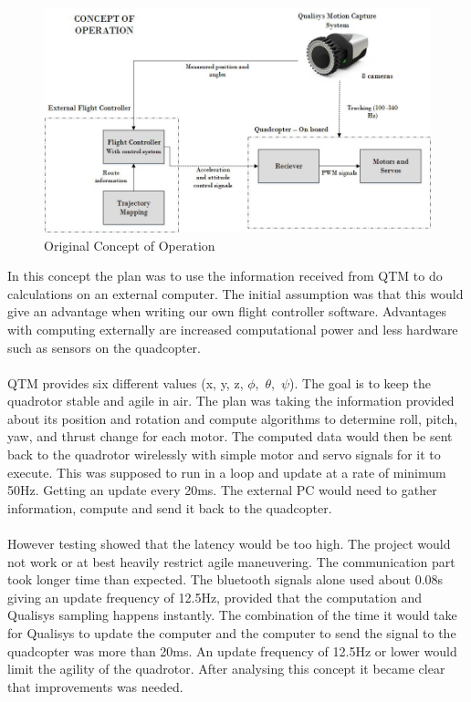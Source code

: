 \begin{figure}[H]
          \centering
            \includegraphics[scale = 0.6]{VAPIQ-PICTURES/ConceptOfOperation.jpg}
                \caption{Original Concept of Operation}
                \label{OCO}
            \label{dir}
\end{figure} 
\newpage
\noindent 
In this concept the plan was to use the information received from QTM to do calculations on an external computer. The initial assumption was that this would give an advantage when writing our own flight controller software. Advantages with computing externally are increased computational power and less hardware such as sensors on the quadcopter. 
\\\\
QTM provides six different values (x, y, z, $ \phi, $ $ \theta ,$ $ \psi $). The goal is to keep the quadrotor stable and agile in air. The plan was taking the information provided about its position and rotation and compute algorithms to determine roll, pitch, yaw, and thrust change for each motor. The computed data would then be sent back to the quadrotor wirelessly with simple motor and servo signals for it to execute. This was supposed to run in a loop and update at a rate of minimum 50Hz. Getting an update every 20ms. The external PC would need to gather information, compute and send it back to the quadcopter. \\
\\
However testing showed that the latency would be too high. The project would not work or at best heavily restrict agile maneuvering. The communication part took longer time than expected. The bluetooth signals alone used about 0.08s giving an update frequency of 12.5Hz, provided that the computation and Qualisys sampling happens instantly. The combination of the time it would take for Qualisys to update the computer and the computer to send the signal to the quadcopter was more than 20ms. An update frequency of 12.5Hz or lower would limit the agility of the quadrotor. After analysing this concept it became clear that improvements was needed.


